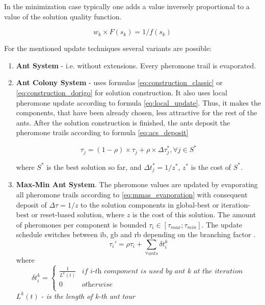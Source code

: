 In the minimization case typically one adds a value inversely proportional to a value of the solution quality function.

\begin{equation}
w_k \times F(s_k) = 1 / f(s_k)
\end{equation}

For the mentioned update techniques several variants are possible: \\

\begin{enumerate}
\item {\textbf{Ant System} - i.e. without extensions. Every pheromone trail is evaporated.}

\item {\textbf{Ant Colony System} - uses formulas \ref{eq:construction_classic} or \ref{eq:construction_dorigo} for solution construction. It also uses local pheromone update according to formula \ref{eq:local_update}. Thus, it makes the components, that have been already chosen, less attractive for the rest of the ants. After the solution construction is finished, the ants deposit the pheromone trails according to formula \ref{eq:acs_deposit}}

\begin{equation}
\tau_j = (1 - \rho) \times \tau_j + \rho \times \Delta \tau_j^*, \forall j \in S^*
\label{eq:acs_deposit}
\end{equation}

where $S^*$ is the best solution so far, and $\Delta t_j^* = 1/z^*$, $z^*$ is the cost of $S^*$.

\item \textbf{Max-Min Ant System}. The pheromone values are updated by evaporating all pheromone trails according to \ref{eq:mmas_evaporation} with consequent deposit of $\Delta \tau = 1 / z$ to the solution components in global-best or iteration-best or reset-based solution, where $z$ is the cost of this solution. The amount of pheromones per component is bounded $\tau_i \in [\tau_{max};\tau_{min}]$. The update schedule switches between ib, gb and rb depending on the branching factor \cite{mmas}.
\begin{equation}
\tau_i' = \rho \tau_i + \sum \limits_{\forall ants} \delta t_i^k
\end{equation}
where
\[
\delta t_i^k =
\left\{
\begin{array}{ll}
      \frac{1}{L^k(t)} & \textit{if i-th component is used by ant k at the iteration}\\
      0 & \textit{otherwise} \\
\end{array} 
\right. 
\]
$L^k(t)$ - \textit{is the length of k-th ant tour}



\end{enumerate}
